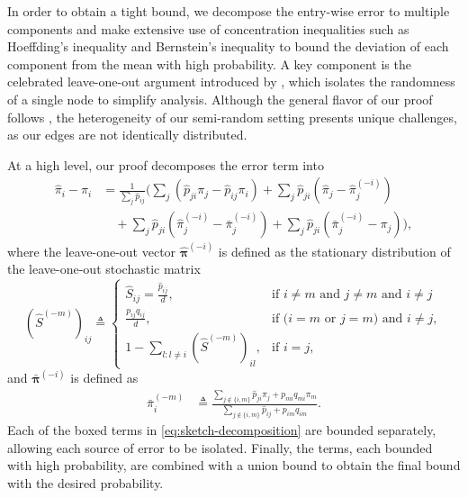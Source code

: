 \documentclass[sigconf,nonacm,pbalance]{acmart}
\begin{document}
In order to obtain a tight bound, we decompose the entry-wise error to multiple components and make extensive use of concentration inequalities such as Hoeffding's inequality and Bernstein's inequality \cite{BoucheronLugosiBousquet2003} to bound the deviation of each component from the mean with high probability. A key component is the celebrated leave-one-out argument introduced by \cite{Chenetal2019}, which isolates the randomness of a single node to simplify analysis. Although the general flavor of our proof follows \cite{Chenetal2019}, the heterogeneity of our semi-random setting presents unique challenges, as our edges are not identically distributed.

At a high level, our proof decomposes the error term into
\begin{align}
\hat{\pi}_i-\pi_i &= \frac{1}{\boxed{\textstyle \sum_j \hat{p}_{ij}}} \biggl( \boxed{\textstyle\sum_j (\hat{p}_{ji}\pi_j-\hat{p}_{ij} \pi_i)} + \boxed{\textstyle \sum_j \hat{p}_{ji} (\hat{\pi}_j - \hat{\pi}^{(-i)}_j)} \\
&\quad + \boxed{\textstyle\sum_j \hat{p}_{ji} (\hat{\pi}^{(-i)}_j-\bar{\pi}^{(-i)}_j)} + \boxed{\textstyle\sum_j \hat{p}_{ji} (\bar{\pi}^{(-i)}_j - \pi_j)} \biggr),\label{eq:sketch-decomposition}
\end{align}
where the leave-one-out vector $\hat{\bm{\pi}}^{(-i)}$ is defined as the stationary distribution of the leave-one-out stochastic matrix
\begin{equation}
    (\hat{S}^{(-m)})_{ij} \triangleq \begin{cases}
        \hat{S}_{ij}=\frac{\hat{p}_{ij}}{d}, & \text{if } i \neq m \text{ and } j \neq m \text{ and } i\neq j \\
        \frac{p_{ij} q_{ij}}{d}, & \text{if (} i=m \text{ or } j=m \text{) and } i \neq j,\\
        1-\sum_{l:l\neq i} (\hat{S}^{(-m)})_{il}, & \text{if } i=j,
    \end{cases}
\end{equation}
and $\bar{\bm{\pi}}^{(-i)}$ is defined as
\begin{align}
    \bar{\pi}^{(-m)}_i &\triangleq \frac{\sum_{j\notin\{i,m\}} \hat{p}_{ji} \pi_j + p_{mi} q_{mi} \pi_m}{\sum_{j\notin\{i,m\}} \hat{p}_{ij} + p_{im} q_{im}}.
\end{align}
Each of the boxed terms in \cref{eq:sketch-decomposition} are bounded separately, allowing each source of error to be isolated. Finally, the terms, each bounded with high probability, are combined with a union bound to obtain the final bound with the desired probability.
\end{document}
